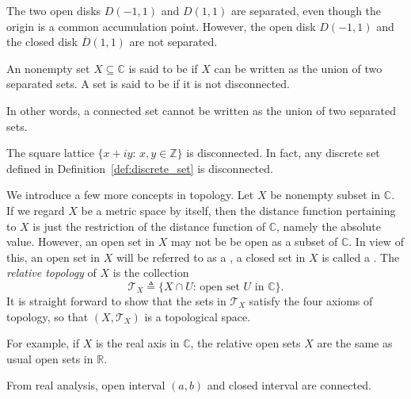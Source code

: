 \begin{example}
The two open disks $D(-1,1)$ and $D(1,1)$ are separated, even though the origin is a common accumulation point. However, the open disk $D(-1,1)$ and the closed disk $\overline{D}(1,1)$ are not separated.
\end{example}

\begin{svgraybox}
	\begin{definition}
An nonempty set $X \subseteq \mathbb{C}$ is said to be  if $X$ can be written as the union of two separated sets. A set is said to be  if it is not disconnected.
	\end{definition}
\end{svgraybox}

In other words, a connected set cannot be written as the union of two separated sets.

\begin{example}
The square lattice $\{x+iy:\, x,y\in\mathbb{Z}\}$ is disconnected. In fact, any discrete set defined in Definition~\ref{def:discrete_set} is disconnected.
\end{example}



We introduce a few more concepts in topology. 
Let $X$ be  nonempty subset in $\mathbb{C}$. If we regard $X$ be a metric space by itself, then the distance function pertaining to $X$ is just the restriction of the distance function of $\mathbb{C}$, namely the absolute value. However, an open set in $X$ may not be be open as a subset of $\mathbb{C}$. In view of this, an open set in $X$ will be referred to as a , a closed set in $X$ is called a . The {\em relative topology} of $X$ is the collection 
$$
\mathcal{T}_X \triangleq \{X\cap U:\, \text{open set $U$ in $\mathbb{C}$}\}.
$$
It is straight forward to show that the sets in $\mathcal{T}_X$ satisfy the four axioms of topology, so that $(X,\mathcal{T}_X)$ is a topological space.

For example, if $X$ is the real axis in $\mathbb{C}$, the relative open sets $X$ are the same as usual open sets in $\mathbb{R}$.

\begin{example}
From real analysis, open interval $(a,b)$ and closed interval are connected.
\end{example}



